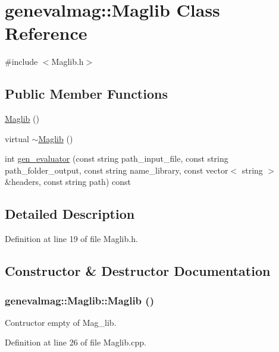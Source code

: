 \hypertarget{classgenevalmag_1_1Maglib}{
\section{genevalmag::Maglib Class Reference}
\label{classgenevalmag_1_1Maglib}
}


{\ttfamily \#include $<$Maglib.h$>$}

\subsection*{Public Member Functions}
\begin{DoxyCompactItemize}
\item 
\hyperlink{classgenevalmag_1_1Maglib_aaba45ec8699f82e6d483a53e14a3466a}{Maglib} ()
\item 
virtual \hyperlink{classgenevalmag_1_1Maglib_a43af6f1f2439a9bb50f6fb273b48739c}{$\sim$Maglib} ()
\item 
int \hyperlink{classgenevalmag_1_1Maglib_ac86d9edcd1aefa47760a6dba4e0e2208}{gen\_\-evaluator} (const string path\_\-input\_\-file, const string path\_\-folder\_\-output, const string name\_\-library, const vector$<$ string $>$ \&headers, const string path) const 
\end{DoxyCompactItemize}


\subsection{Detailed Description}


Definition at line 19 of file Maglib.h.



\subsection{Constructor \& Destructor Documentation}
\hypertarget{classgenevalmag_1_1Maglib_aaba45ec8699f82e6d483a53e14a3466a}{
\subsubsection[{Maglib}]{\setlength{\rightskip}{0pt plus 5cm}genevalmag::Maglib::Maglib ()}}
\label{classgenevalmag_1_1Maglib_aaba45ec8699f82e6d483a53e14a3466a}
Contructor empty of Mag\_\-lib. 

Definition at line 26 of file Maglib.cpp.

